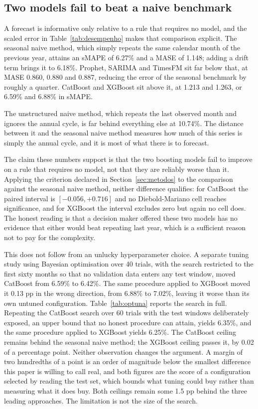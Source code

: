 \subsection{Two models fail to beat a naive benchmark}\label{sec:naive}

A forecast is informative only relative to a rule that requires no model, and the scaled
error in Table~\ref{tab:desempenho} makes that comparison explicit. The seasonal naive
method, which simply repeats the same calendar month of the previous year, attains an sMAPE
of 6.27\% and a MASE of 1.148; adding a drift term brings it to 6.18\%. Prophet, SARIMA and
TimesFM sit far below that, at MASE 0.860, 0.880 and 0.887, reducing the error of the
seasonal benchmark by roughly a quarter. CatBoost and XGBoost sit above it, at 1.213 and
1.263, or 6.59\% and 6.88\% in sMAPE.

The unstructured naive method, which repeats the last observed month and ignores the annual
cycle, is far behind everything else at 10.74\%. The distance between it and the seasonal
naive method measures how much of this series is simply the annual cycle, and it is most of
what there is to forecast.

The claim these numbers support is that the two boosting models fail to improve on a rule
that requires no model, not that they are reliably worse than it. Applying the criterion
declared in Section~\ref{sec:metodos} to the comparison against the seasonal naive method,
neither difference qualifies: for CatBoost the paired interval is $[-0.056, +0.716]$ and no
Diebold-Mariano cell reaches significance, and for XGBoost the interval excludes zero but
again no cell does. The honest reading is that a decision maker offered these two models has
no evidence that either would beat repeating last year, which is a sufficient reason not to
pay for the complexity.

This does not follow from an unlucky hyperparameter choice. A separate tuning study using
Bayesian optimisation over 40 trials, with the search restricted to the first sixty months
so that no validation data enters any test window, moved CatBoost from 6.59\% to 6.42\%.
The same procedure applied to XGBoost moved it 0.13 pp in the wrong direction, from 6.88\%
to 7.02\%, leaving it worse than its own untuned configuration.
Table~\ref{tab:optuna} reports the search in full.
Repeating the CatBoost search over 60 trials with
the test windows deliberately exposed, an upper bound that no honest procedure can attain,
yields 6.35\%, and the same procedure applied to XGBoost yields 6.25\%. The CatBoost ceiling
remains behind the seasonal naive method; the XGBoost ceiling passes it, by 0.02 of a
percentage point. Neither observation changes the argument. A margin of two hundredths of a
point is an order of magnitude below the smallest difference this paper is willing to call
real, and both figures are the score of a configuration selected by reading the test set,
which bounds what tuning could buy rather than measuring what it does buy. Both ceilings
remain some 1.5 pp behind the three leading approaches.
The limitation is not the size of the search.

